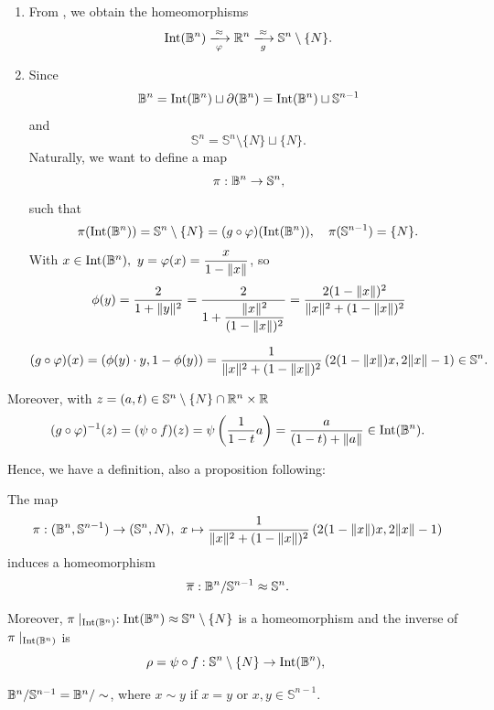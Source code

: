 \begin{remark}\label{rmk:pi-assembly}
    \begin{enumerate}
        \item From , we obtain the homeomorphisms
        \[\Int(\B^n) \xlongrightarrow[\varphi]{\approx}\R^n \xlongrightarrow[g]{\approx} \mathbb{S}^n\setminus\{N\}.\]
    
        \item Since 
        \[\mathbb{B}^n = \operatorname{Int}(\mathbb{B}^n) \sqcup \partial(\mathbb{B}^n)=\operatorname{Int}(\mathbb{B}^n) \sqcup \mathbb{S}^{n-1}\] and 
        \[\mathbb{S}^n = \mathbb{S}^n\setminus\{N\} \sqcup \{N\}.\]
        Naturally, we want to define a map
        \[\pi: \mathbb{B}^n \to \mathbb{S}^n, \]
        such that 
        \[\pi(\operatorname{Int}(\mathbb{B}^n)) = \mathbb{S}^{n}\setminus \{N\}= (g \circ \varphi)(\operatorname{Int}(\mathbb{B}^n)),\quad  \pi(\mathbb{S}^{n-1}) = \{N\}.\]
        With $x \in \operatorname{Int}(\mathbb{B}^n),~y = \varphi(x) = \dfrac{x}{1-\lVert x\rVert}$, so 
            \[\phi(y)=\dfrac{2}{1+\lVert y\rVert^2}
            =\dfrac{2}{1+\dfrac{\lVert x\rVert^2}{(1-\lVert x\rVert)^2}} 
            = \dfrac{2(1-\lVert x\rVert)^2}{\lVert x\rVert^2 + (1-\lVert x\rVert)^2}\]
        
       \[(g\circ \varphi)(x)
            = \left(\phi(y)\cdot y, 1-\phi(y)\right)
            =\dfrac{1}{\lVert x\rVert^2+(1-\lVert x\rVert)^2}\left(2(1-\lVert x\rVert)x, 2\lVert x\rVert-1\right) \in \mathbb{S}^n.\]
        \end{enumerate}
    Moreover, with $z = (a,t) \in \mathbb{S}^n\setminus\{N\} \cap \mathbb{R}^n \times \mathbb{R}$
        \[(g\circ \varphi)^{-1}(z)
        =(\psi\circ f)(z)
        =\psi\left(\dfrac{1}{1-t}a\right)
        = \dfrac{a}{(1-t)+\lVert a\rVert} \in \operatorname{Int}(\mathbb{B}^n).\]
\end{remark}

Hence, we have a definition, also a proposition following:
\begin{proposition}\label{prop:quotient-pi}
    The map 
    \[\pi:(\mathbb{B}^n, \mathbb{S}^{n-1})\to (\mathbb{S}^n,N),~x \mapsto \dfrac{1}{\lVert x\rVert^2+(1-\lVert x\rVert)^2}\left(2(1-\lVert x\rVert)x, 2\lVert x\rVert-1\right)\]
    induces a homeomorphism \[\overline{\pi}:\mathbb{B}^n/\mathbb{S}^{n-1} \approx \mathbb{S}^n.\]
    
    Moreover, $\pi \mid_{\operatorname{Int}(\mathbb{B}^n)}: \operatorname{Int}(\mathbb{B}^n) \approx \mathbb{S}^n\setminus\{N\}$ is a homeomorphism and the inverse of $\pi \mid_{\operatorname{Int}(\mathbb{B}^n)}$ is
    \[\rho = \psi \circ f: \mathbb{S}^n\setminus\{N\} \to \operatorname{Int}(\mathbb{B}^n),~\]
\end{proposition}

\begin{remark}\label{rmk:quotient-remark}
    $\mathbb{B}^n/\mathbb{S}^{n-1} = \mathbb{B}^n/\sim$, where $x\sim y$ if $x = y$ or $x,y\in \mathbb{S}^{n-1}$. 
\end{remark}

